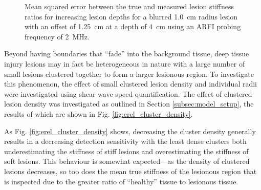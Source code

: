 			\begin{figure}[!htb]
				\centering
				\caption[Shear-wave speed quantified mean squared error related to lesion blurring]{Mean squared error between the true and measured lesion stiffness ratios for increasing lesion depths for a blurred \SI{1.0}{cm} radius lesion with an offset of \SI{1.25}{\cm} at a depth of \SI{4}{\cm} using an ARFI probing frequency of \SI{2}{\MHz}.}
				\label{fig:erel_blur_mse}
			\end{figure}

			Beyond having boundaries that ``fade'' into the background tissue, deep tissue injury lesions may in fact be heterogeneous in nature with a large number of small lesions clustered together to form a larger lesionous region. To investigate this phenomenon, the effect of small clustered lesion density and individual radii were investigated using shear wave speed quantification. The effect of clustered lesion density was investigated as outlined in Section \ref{subsec:model_setup}, the results of which are shown in Fig. \ref{fig:erel_cluster_density}. 

			As Fig. \ref{fig:erel_cluster_density} shows, decreasing the cluster density generally results in a decreasing detection sensitivity with the least dense clusters both underestimating the stiffness of stiff lesions and overestimating the stiffness of soft lesions. This behaviour is somewhat expected---as the density of clustered lesions decreases, so too does the mean true stiffness of the lesionous region that is inspected due to the greater ratio of ``healthy'' tissue to lesionous tissue.

